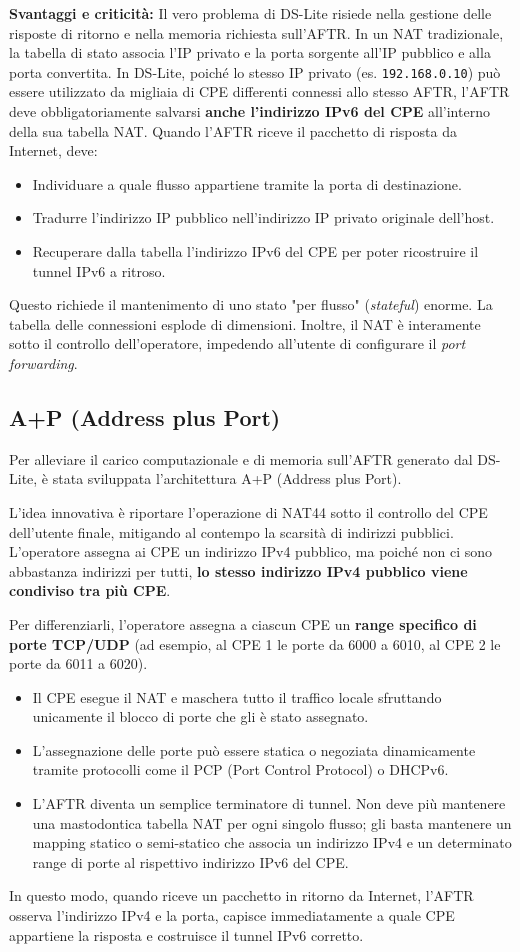 \textbf{Svantaggi e criticità:}
Il vero problema di DS-Lite risiede nella gestione delle risposte di ritorno e nella memoria richiesta sull'AFTR. In un NAT tradizionale, la tabella di stato associa l'IP privato e la porta sorgente all'IP pubblico e alla porta convertita.
In DS-Lite, poiché lo stesso IP privato (es. \texttt{192.168.0.10}) può essere utilizzato da migliaia di CPE differenti connessi allo stesso AFTR, l'AFTR deve obbligatoriamente salvarsi \textbf{anche l'indirizzo IPv6 del CPE} all'interno della sua tabella NAT.
Quando l'AFTR riceve il pacchetto di risposta da Internet, deve:
\begin{itemize}
\item Individuare a quale flusso appartiene tramite la porta di destinazione.
\item Tradurre l'indirizzo IP pubblico nell'indirizzo IP privato originale dell'host.
\item Recuperare dalla tabella l'indirizzo IPv6 del CPE per poter ricostruire il tunnel IPv6 a ritroso.
\end{itemize}
Questo richiede il mantenimento di uno stato "per flusso" (\textit{stateful}) enorme. La tabella delle connessioni esplode di dimensioni. Inoltre, il NAT è interamente sotto il controllo dell'operatore, impedendo all'utente di configurare il \textit{port forwarding}.

\subsection{A+P (Address plus Port)}
Per alleviare il carico computazionale e di memoria sull'AFTR generato dal DS-Lite, è stata sviluppata l'architettura A+P (Address plus Port).

L'idea innovativa è riportare l'operazione di NAT44 sotto il controllo del CPE dell'utente finale, mitigando al contempo la scarsità di indirizzi pubblici. L'operatore assegna ai CPE un indirizzo IPv4 pubblico, ma poiché non ci sono abbastanza indirizzi per tutti, \textbf{lo stesso indirizzo IPv4 pubblico viene condiviso tra più CPE}.

Per differenziarli, l'operatore assegna a ciascun CPE un \textbf{range specifico di porte TCP/UDP} (ad esempio, al CPE 1 le porte da 6000 a 6010, al CPE 2 le porte da 6011 a 6020).
\begin{itemize}
\item Il CPE esegue il NAT e maschera tutto il traffico locale sfruttando unicamente il blocco di porte che gli è stato assegnato.
\item L'assegnazione delle porte può essere statica o negoziata dinamicamente tramite protocolli come il PCP (Port Control Protocol) o DHCPv6.
\item L'AFTR diventa un semplice terminatore di tunnel. Non deve più mantenere una mastodontica tabella NAT per ogni singolo flusso; gli basta mantenere un mapping statico o semi-statico che associa un indirizzo IPv4 e un determinato range di porte al rispettivo indirizzo IPv6 del CPE.
\end{itemize}
In questo modo, quando riceve un pacchetto in ritorno da Internet, l'AFTR osserva l'indirizzo IPv4 e la porta, capisce immediatamente a quale CPE appartiene la risposta e costruisce il tunnel IPv6 corretto.

